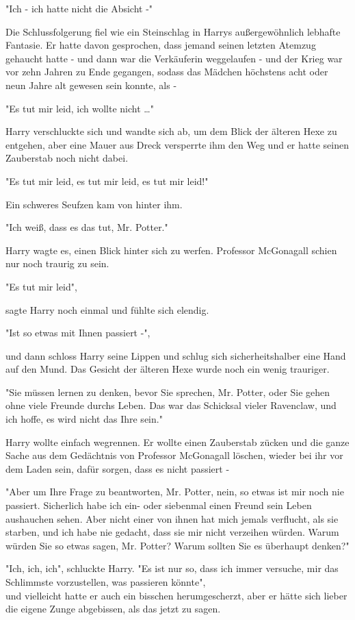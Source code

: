 {"Ich - ich hatte nicht die Absicht -"

Die Schlussfolgerung fiel wie ein Steinschlag in Harrys außergewöhnlich lebhafte Fantasie. Er hatte davon gesprochen, dass jemand seinen letzten Atemzug gehaucht hatte - und dann war die Verkäuferin weggelaufen - und der Krieg war vor zehn Jahren zu Ende gegangen, sodass das Mädchen höchstens acht oder neun Jahre alt gewesen sein konnte, als -

"Es tut mir leid, ich wollte nicht …"

Harry verschluckte sich und wandte sich ab, um dem Blick der älteren Hexe zu entgehen, aber eine Mauer aus Dreck versperrte ihm den Weg und er hatte seinen Zauberstab noch nicht dabei.

"Es tut mir leid, es tut mir leid, es tut mir leid!"

Ein schweres Seufzen kam von hinter ihm.

"Ich weiß, dass es das tut, Mr. Potter."

Harry wagte es, einen Blick hinter sich zu werfen. Professor McGonagall schien nur noch traurig zu sein.

"Es tut mir leid",

sagte Harry noch einmal und fühlte sich elendig.

"Ist so etwas mit Ihnen passiert -",

und dann schloss Harry seine Lippen und schlug sich sicherheitshalber eine Hand auf den Mund. Das Gesicht der älteren Hexe wurde noch ein wenig trauriger.

"Sie müssen lernen zu denken, bevor Sie sprechen, Mr. Potter, oder Sie gehen ohne viele Freunde durchs Leben. Das war das Schicksal vieler Ravenclaw, und ich hoffe, es wird nicht das Ihre sein."

Harry wollte einfach wegrennen. Er wollte einen Zauberstab zücken und die ganze Sache aus dem Gedächtnis von Professor McGonagall löschen, wieder bei ihr vor dem Laden sein, dafür sorgen, dass es nicht passiert -

"Aber um Ihre Frage zu beantworten, Mr. Potter, nein, so etwas ist mir noch nie passiert. Sicherlich habe ich ein- oder siebenmal einen Freund sein Leben aushauchen sehen. Aber nicht einer von ihnen hat mich jemals verflucht, als sie starben, und ich habe nie gedacht, dass sie mir nicht verzeihen würden. Warum würden Sie so etwas sagen, Mr. Potter? Warum sollten Sie es überhaupt denken?"

"Ich, ich, ich", schluckte Harry. "Es ist nur so, dass ich immer versuche, mir das Schlimmste vorzustellen, was passieren könnte",\\ und vielleicht hatte er auch ein bisschen herumgescherzt, aber er hätte sich lieber die eigene Zunge abgebissen, als das jetzt zu sagen.

}

